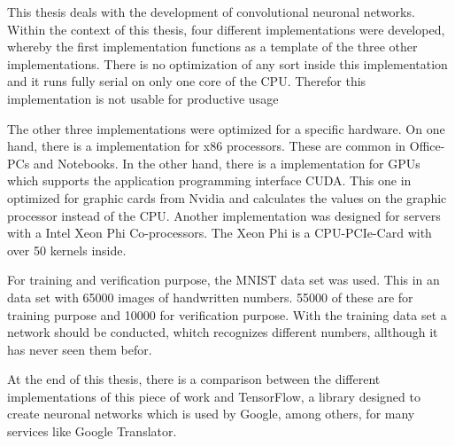 \documentclass[../main.tex]{subfiles}
\begin{document}
This thesis deals with the development of convolutional neuronal networks. Within the context of this thesis, four different implementations were developed, whereby the first implementation functions as a template of the three other implementations. There is no optimization of any sort inside this implementation and it runs fully serial on only one core of the CPU. Therefor this implementation is not usable for productive usage

The other three implementations were optimized for a specific hardware. On one hand, there is a implementation for x86 processors. These are common in Office-PCs and Notebooks. In the other hand, there is a implementation for GPUs which supports the application programming interface CUDA. This one in optimized for graphic cards from Nvidia and calculates the values on the graphic processor instead of the CPU. Another implementation was designed for servers with a Intel Xeon Phi Co-processors. The Xeon Phi is a CPU-PCIe-Card with over 50 kernels inside.

For training and verification purpose, the MNIST data set was used. This in an data set with 65000 images of handwritten numbers. 55000 of these are for training purpose and 10000 for verification purpose. With the training data set a network should be conducted, whitch recognizes different numbers, allthough it has never seen them befor.

At the end of this thesis, there is a comparison between the different implementations of this piece of work and TensorFlow, a library designed to create neuronal networks which is used by Google, among others, for many services like Google Translator.
\end{document}
